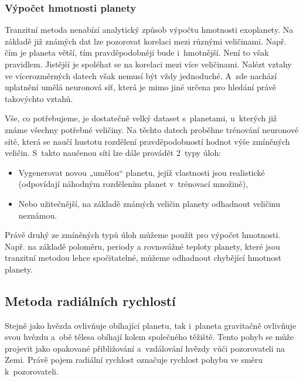 \documentclass[a4paper,12pt]{article}
\begin{document}
{{

\subsubsection{Výpočet hmotnosti planety}

Tranzitní metoda nenabízí analytický způsob výpočtu hmotnosti exoplanety. Na základě již známých dat lze pozorovat korelaci mezi různými veličinami. Např. čím je planeta větší, tím pravděpodobněji bude i~hmotnější. Není to však pravidlem. Jistější je spoléhat se na korelaci mezi více veličinami. Nalézt vztahy ve vícerozměrných datech však nemusí být vždy jednoduché. A~zde nachází uplatnění umělá neuronová síť, která je mimo jiné určena pro hledání právě takovýchto vztahů.~\cite{nnmass}

Vše, co potřebujeme, je dostatečně velký dataset s~planetami, u~kterých již známe všechny potřebné veličiny. Na těchto datech proběhne trénování neuronové sítě, která se naučí hustotu rozdělení pravděpodobností hodnot výše zmíněných veličin. S~takto naučenou sítí lze dále provádět 2~typy úloh:

\begin{itemize}
\item Vygenerovat novou „umělou“ planetu, jejíž vlastnosti jsou realistické (odpovídají náhodným rozdělením planet v~trénovací množině),

\item Nebo užitečnější, na základě známých veličin planety odhadnout veličinu neznámou.
\end{itemize}

Právě druhý ze zmíněných typů úloh můžeme použít pro výpočet hmotnosti. Např. na základě poloměru, periody a rovnovážné teploty planety, které jsou tranzitní metodou lehce spočitatelné, můžeme odhadnout chybějící hmotnost planety.~\cite{nnmass}

\clearpage
\subsection{Metoda radiálních rychlostí}

Stejně jako hvězda ovlivňuje obíhající planetu, tak i~planeta gravitačně ovlivňuje svou hvězdu a~obě tělesa obíhají kolem společného těžiště. Tento pohyb se může projevit jako opakované přibližování a~vzdálování hvězdy vůči pozorovateli na Zemi. Právě pojem radiální rychlost označuje rychlost pohybu ve směru k~pozorovateli.~\cite{methods}

}}
\end{document}
